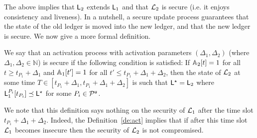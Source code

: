 




The above implies that $\mathsf{L}_2$  extends $\mathsf{L}_1$ and that $\mathcal{L}_2$ is secure (i.e. it enjoys consistency and liveness).
In a nutshell, a secure update process guarantees that the state of the old ledger is moved into the new ledger, and that the new ledger is secure.
We now give a more formal definition.

\begin{definition}\label{de:act}
 We say that an activation process with activation parameters $(\Delta_1,\Delta_2)$ (where $\Delta_1,\Delta_2\in\mathbb{N}$) is secure if the following condition is satisfied:
If $\mathbb{A}_2[t]=1$ for all $t\geq t_{P_1}+\Delta_1$ %
and $\mathbb{A}_1[t']=1$ for all $t' \leq t_{P_1}+\Delta_1+\Delta_2$, then the state of $\mathcal{L}_2$ at some time $T\in [t_{P_1}+\Delta_1, t_{P_1}+\Delta_1+\Delta_2]$ is such that $\mathsf{L}^\star=\mathsf{L}_2$ where $  \mathsf{L}_1^{P_i}[t_{P_i}] \preceq \mathsf{L}^\star$ for some $P_i\in\mathcal{P}^\mathsf{u}$.  
\end{definition}

We note that this definition says nothing on the security of $\mathcal{L}_1$ after the time slot $t_{P_1}+\Delta_1+\Delta_2$. Indeed, the Definition~\ref{de:act} implies that if
after this time slot $\mathcal{L}_1$ becomes insecure then the security of $\mathcal{L}_2$ is not compromised.



